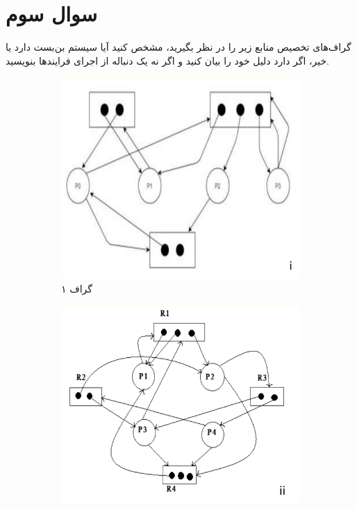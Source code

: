\section{سوال سوم}
گراف‌های تخصیص منابع زیر را در نظر بگیرید، مشخص کنید آیا سیستم بن‌بست دارد یا خیر، اگر دارد دلیل خود را بیان کنید و اگر نه یک دنباله از اجرای فرایند‌ها بنویسید.

\begin{figure}[h]
	\centering
	\begin{subfigure}[b]{0.3\textwidth}
		\centering
		\includegraphics[width=\textwidth]{pics/img1.png}
		\caption{گراف ۱}
		\label{شکل۱ الف}
	\end{subfigure}
	\hfill
	\begin{subfigure}[b]{0.3\textwidth}
		\centering
		\includegraphics[width=\textwidth]{pics/img2.png}

\end{subfigure}
\end{figure}
